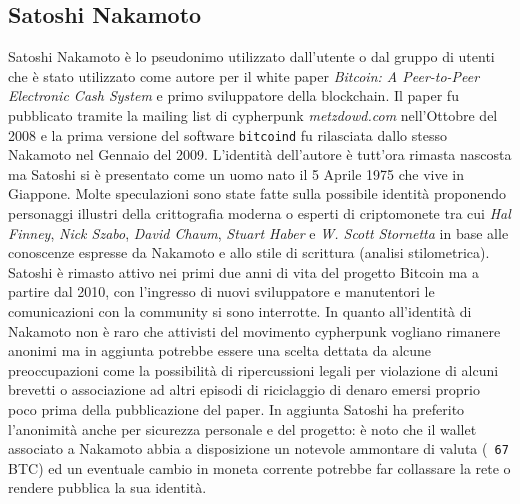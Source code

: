 \appendix
\begin{appendices}
    \chapter{Satoshi Nakamoto}\label{app:satoshi}
    Satoshi Nakamoto è lo pseudonimo utilizzato dall'utente o dal gruppo di utenti che è stato utilizzato come autore per il white paper \textit{Bitcoin: A Peer-to-Peer Electronic Cash System} e primo sviluppatore della blockchain.\newline
    Il paper fu pubblicato tramite la mailing list di cypherpunk \textit{metzdowd.com} nell'Ottobre del 2008 e la prima versione del software \texttt{bitcoind} fu rilasciata dallo stesso Nakamoto nel Gennaio del 2009.\newline
    L'identità dell'autore è tutt'ora rimasta nascosta ma Satoshi si è presentato come un uomo nato il 5 Aprile 1975 che vive in Giappone. Molte speculazioni sono state fatte sulla possibile identità proponendo personaggi illustri della crittografia moderna o esperti di criptomonete tra cui \textit{Hal Finney}, \textit{Nick Szabo}, \textit{David Chaum}, \textit{Stuart Haber} e \textit{W. Scott Stornetta} in base alle conoscenze espresse da Nakamoto e allo stile di scrittura (analisi stilometrica).\newline
    Satoshi è rimasto attivo nei primi due anni di vita del progetto Bitcoin ma a partire dal 2010, con l'ingresso di nuovi sviluppatore e manutentori le comunicazioni con la community si sono interrotte.\newline
    In quanto all'identità di Nakamoto non è raro che attivisti del movimento cypherpunk vogliano rimanere anonimi ma in aggiunta potrebbe essere una scelta dettata da alcune preoccupazioni come la possibilità di ripercussioni legali per violazione di alcuni brevetti o associazione ad altri episodi di riciclaggio di denaro emersi proprio poco prima della pubblicazione del paper.\newline
    In aggiunta Satoshi ha preferito l'anonimità anche per sicurezza personale e del progetto: è noto che il wallet associato a Nakamoto abbia a disposizione un notevole ammontare di valuta (\texttt{~67} BTC) ed un eventuale cambio in moneta corrente potrebbe far collassare la rete o rendere pubblica la sua identità.
\end{appendices}

